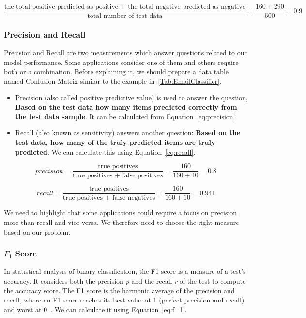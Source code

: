 \begin{equation}\label{eq:accuracy_calculation}
\frac{\text{the total positive predicted as positive + the total negative predicted as negative}}{\text{total number of test data}} = \frac{160+290}{500}=0.9 
\end{equation}%


\subsubsection{Precision and Recall}

Precision and Recall are two measurements which answer questions related to our model performance. Some applications consider one of them and others require both or a combination. Before explaining it, we should prepare a data table named Confusion Matrix similar to the example in~\ref{Tab:EmailClassifier}.

\begin{itemize}
\item Precision (also called positive predictive value) is used to answer the question, \textbf{Based on the test data how many items predicted correctly from the test data sample}. It can be calculated from Equation~\eqref{eq:precision}.
\item Recall (also known as sensitivity) answers another question: \textbf{Based on the test data, how many of the truly predicted items are truly predicted}. We can calculate this using Equation~\eqref{eq:recall}.
\end{itemize}

\begin{equation}\label{eq:precision}
precision = \frac{\text{true positives}}{\text{true positives + false positives}} = \frac{160}{160 + 40}=0.8
\end{equation}%


\begin{equation}\label{eq:recall}
recall = \frac{\text{true positives}}{\text{true positives + false negatives}} = \frac{160}{160 + 10}=0.941
\end{equation}%

We need to highlight that some applications could require a focus on precision more than recall and vice-versa. We therefore need to choose the right measure based on our problem.
 
\subsubsection{$F_1$ Score}
In statistical analysis of binary classification, the F1 score is a measure of a test's accuracy. It considers both the precision \textit{p} and the recall \textit{r} of the test to compute the accuracy score. The F1 score is the harmonic average of the precision and recall, where an F1 score reaches its best value at 1 (perfect precision and recall) and worst at 0~\cite{Wiki_f1_score}. We can calculate it using Equation~\eqref{eq:f_1}.

